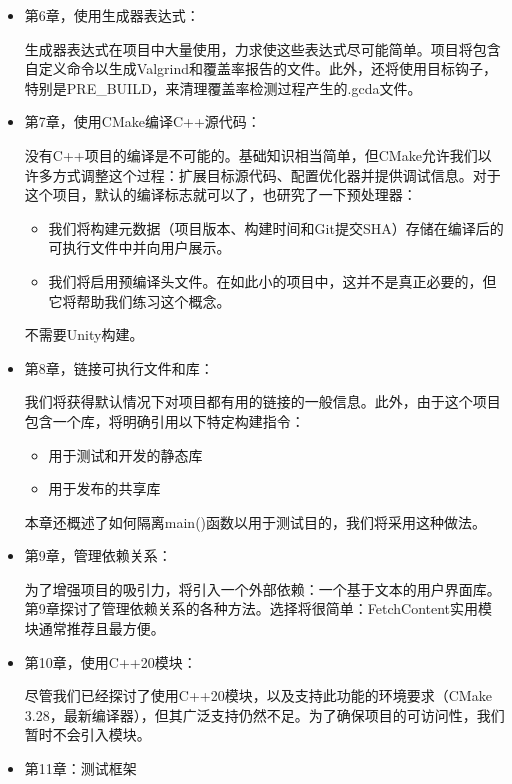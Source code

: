 \begin{itemize}
\item
第6章，使用生成器表达式：

生成器表达式在项目中大量使用，力求使这些表达式尽可能简单。项目将包含自定义命令以生成Valgrind和覆盖率报告的文件。此外，还将使用目标钩子，特别是PRE\_BUILD，来清理覆盖率检测过程产生的.gcda文件。

\item
第7章，使用CMake编译C++源代码：

没有C++项目的编译是不可能的。基础知识相当简单，但CMake允许我们以许多方式调整这个过程：扩展目标源代码、配置优化器并提供调试信息。对于这个项目，默认的编译标志就可以了，也研究了一下预处理器：

\begin{itemize}
\item
我们将构建元数据（项目版本、构建时间和Git提交SHA）存储在编译后的可执行文件中并向用户展示。

\item
我们将启用预编译头文件。在如此小的项目中，这并不是真正必要的，但它将帮助我们练习这个概念。
\end{itemize}

不需要Unity构建。

\item
第8章，链接可执行文件和库：

我们将获得默认情况下对项目都有用的链接的一般信息。此外，由于这个项目包含一个库，将明确引用以下特定构建指令：

\begin{itemize}
\item
用于测试和开发的静态库

\item
用于发布的共享库
\end{itemize}

本章还概述了如何隔离main()函数以用于测试目的，我们将采用这种做法。

\item
第9章，管理依赖关系：

为了增强项目的吸引力，将引入一个外部依赖：一个基于文本的用户界面库。第9章探讨了管理依赖关系的各种方法。选择将很简单：FetchContent实用模块通常推荐且最方便。

\item
第10章，使用C++20模块：

尽管我们已经探讨了使用C++20模块，以及支持此功能的环境要求（CMake 3.28，最新编译器），但其广泛支持仍然不足。为了确保项目的可访问性，我们暂时不会引入模块。

\item
第11章：测试框架


\end{itemize}
